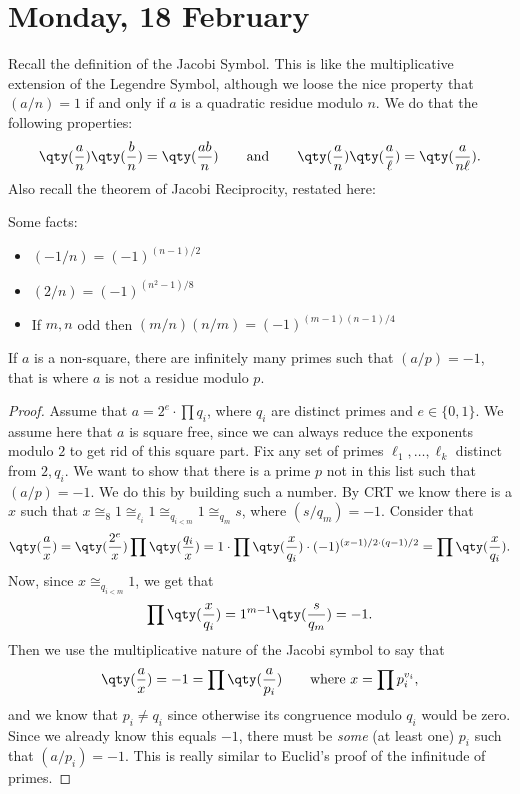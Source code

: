 
\section{Monday, 18 February}

Recall the definition of the Jacobi Symbol. This is like the multiplicative extension of the  Legendre Symbol, although we loose the nice property that $(a/n) = 1$ if and only if $a$ is a quadratic residue modulo $n$. We do that the following properties:
\[ \qty(\frac{a}{n})\qty(\frac{b}{n}) = \qty(\frac{ab}{n}) \qquad \text{and} \qquad \qty(\frac{a}{n})\qty(\frac{a}{\ell}) = \qty(\frac{a}{n\ell}). \]
Also recall the theorem of Jacobi Reciprocity, restated here:
\begin{theorem}
Some facts:
\begin{itemize}
\item $(-1/n) = (-1)^{(n-1)/2}$
\item $(2/n) = (-1)^{(n^2-1)/8}$
\item If $m,n$ odd then $(m/n)(n/m) = (-1)^{(m-1)(n-1)/4}$
\end{itemize}
\end{theorem}

\begin{theorem}
If $a$ is a non-square, there are infinitely many primes such that\/ $(a/p) = -1$, that is where $a$ is not a residue modulo $p$.
\end{theorem}

\begin{proof}
Assume that $a = 2^e \cdot \prod q_i$, where $q_i$ are distinct primes and $e \in \{0,1\}$. We assume here that $a$ is square free, since we can always reduce the exponents modulo $2$ to get rid of this square part. Fix any set of primes $\ell_1, \dotsc, \ell_k$ distinct from $2,q_i$. We want to show that there is a prime $p$ not in this list such that $(a/p) = -1$. We do this by building such a number. By CRT we know there is a $x$ such that $x \cong_8 1 \cong_{\ell_i} 1 \cong_{q_{i < m}} 1 \cong_{q_m} s$, where $(s/q_m) = -1$. Consider that 
\[ \qty(\frac{a}{x}) = \qty(\frac{2^e}{x}) \prod \qty(\frac{q_i}{x}) = 1 \cdot \prod \qty(\frac{x}{q_i}) \cdot (-1)^{(x-1)/2 \cdot (q-1)/2} = \prod \qty(\frac{x}{q_i}). \]
Now, since $x \cong_{q_{i<m}} 1$, we get that 
\[ \prod \qty(\frac{x}{q_i}) = 1^{m-1} \qty(\frac{s}{q_m}) = -1. \]
Then we use the multiplicative nature of the Jacobi symbol to say that 
\[ \qty(\frac{a}{x}) = -1 = \prod \qty(\frac{a}{p_i}) \qquad \text{where~} x = \prod p_i^{v_i}, \]
and we know that $p_i \not= q_i$ since otherwise its congruence modulo $q_i$ would be zero. Since we already know this equals $-1$, there must be \emph{some} (at least one) $p_i$ such that $(a/p_i) = -1$. This is really similar to Euclid's proof of the infinitude of primes.
\end{proof}

